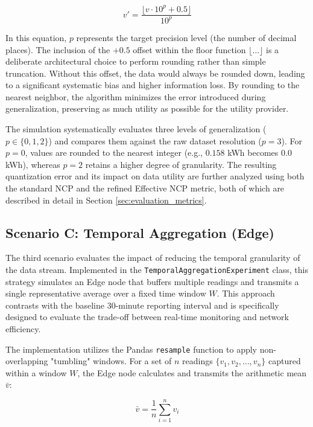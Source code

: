 \begin{equation}
    v' = \frac{\lfloor v \cdot 10^p + 0.5 \rfloor}{10^p}
\end{equation}

In this equation, $p$ represents the target precision level (the number of decimal places). The inclusion of the $+0.5$ offset within the floor function $\lfloor \dots \rfloor$ is a deliberate architectural choice to perform rounding rather than simple truncation. Without this offset, the data would always be rounded down, leading to a significant systematic bias and higher information loss. By rounding to the nearest neighbor, the algorithm minimizes the error introduced during generalization, preserving as much utility as possible for the utility provider.


The simulation systematically evaluates three levels of generalization ($p \in \{0, 1, 2\}$) and compares them against the raw dataset resolution ($p=3$). For $p=0$, values are rounded to the nearest integer (e.g., $0.158$ kWh becomes $0.0$ kWh), whereas $p=2$ retains a higher degree of granularity. The resulting quantization error and its impact on data utility are further analyzed using both the standard \ac{NCP} and the refined Effective \ac{NCP} metric, both of which are described in detail in Section \ref{sec:evaluation_metrics}.

\subsection{Scenario C: Temporal Aggregation (Edge)}
The third scenario evaluates the impact of reducing the temporal granularity of the data stream. Implemented in the \texttt{TemporalAggregationExperiment} class, this strategy simulates an Edge node that buffers multiple readings and transmits a single representative average over a fixed time window $W$. This approach contrasts with the baseline 30-minute reporting interval and is specifically designed to evaluate the trade-off between real-time monitoring and network efficiency.

The implementation utilizes the Pandas \texttt{resample} function to apply non-overlapping "tumbling" windows. For a set of $n$ readings $\{v_1, v_2, \dots, v_n\}$ captured within a window $W$, the Edge node calculates and transmits the arithmetic mean $\bar{v}$:

\begin{equation}
    \bar{v} = \frac{1}{n} \sum_{i=1}^{n} v_i
\end{equation}

